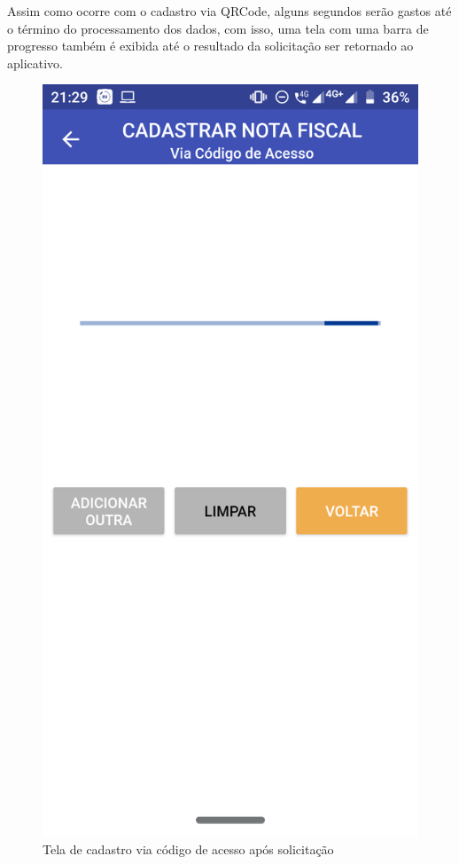 Assim como ocorre com o cadastro via QRCode, alguns segundos serão gastos até o término do processamento dos dados, com isso, uma tela com uma barra de progresso também é exibida até o resultado da solicitação ser retornado ao aplicativo.

\newpage
\begin{figure}[h]
    \centering
    \includegraphics[scale=0.15]{tcc/figures/app/app_codigo_acesso_loading_solicitacao.png}
    \caption{Tela de cadastro via código de acesso após solicitação}
    \label{appCodigoAcessoLoadingSolicitacaoFig}
\end{figure}

